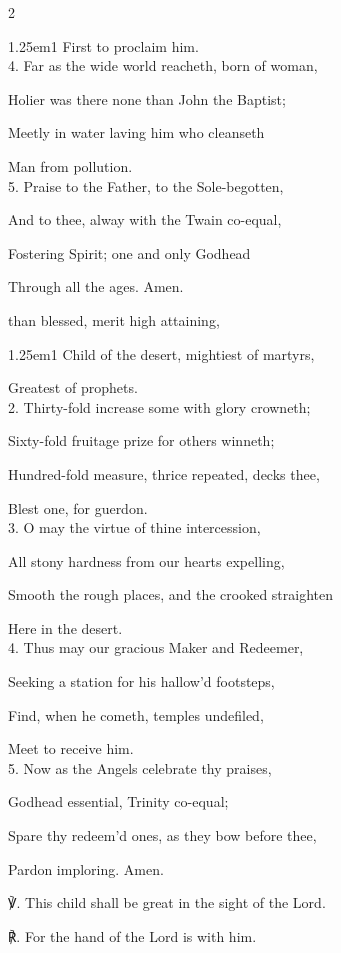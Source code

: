 \begin{paracol}{2}
\begin{hangparas}{1.25em}{1}
First to proclaim him.\\

4. Far as the wide world reacheth, born of woman,

Holier was there none than John the Baptist;

Meetly in water laving him who cleanseth

Man from pollution.\\

5. Praise to the Father, to the Sole-begotten,

And to thee, alway with the Twain co-equal,

Fostering Spirit; one and only Godhead

Through all the ages. Amen.
\end{hangparas}

\mattinsOfficeHymn
{} than blessed, merit high attaining,


\begin{hangparas}{1.25em}{1}
Child of the desert, mightiest of martyrs,

Greatest of prophets.\\

2. Thirty-fold increase some with glory crowneth;

Sixty-fold fruitage prize for others winneth;

Hundred-fold measure, thrice repeated, decks thee,

Blest one, for guerdon.\\

3. O may the virtue of thine intercession,

All stony hardness from our hearts expelling,

Smooth the rough places, and the crooked straighten

Here in the desert.\\

4. Thus may our gracious Maker and Redeemer,

Seeking a station for his hallow'd footsteps,

Find, when he cometh, temples undefiled,

Meet to receive him.\\

5. Now as the Angels celebrate thy praises,

Godhead essential, Trinity co-equal;

Spare thy redeem'd ones, as they bow before thee,

Pardon imploring. Amen.\\
\end{hangparas}

℣. This child shall be great in the sight of the Lord.

℟. For the hand of the Lord is with him.



\fussy
\end{paracol}


